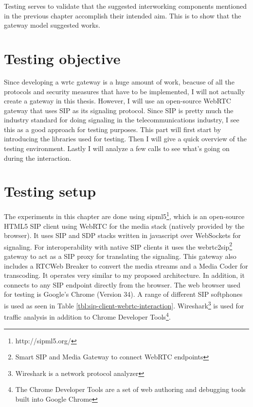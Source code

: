 



Testing serves to validate that the suggested interworking components mentioned in the previous chapter accomplish their intended aim. This is to show that the gateway model suggested works.

\section{Testing objective}
Since developing a \gls{wrtc} gateway is a huge amount of work, beacuse of all the protocols and security measures that have to be implemented, I will not actually create a gateway in this thesis. However, I will use an open-source WebRTC gateway that uses SIP as its signaling protocol. Since SIP is pretty much the industry standard for doing signaling in the telecommunications industry, I see this as a good approach for testing purposes. This part will first start by introducing the libraries used for testing. Then I will give a quick overview of the testing environment. Lastly I will analyze a few calls to see what's going on during the interaction.

\section{Testing setup}
The experiments in this chapter are done using sipml5\footnote{http://sipml5.org/}, which is an open-source HTML5 SIP client using WebRTC for the media stack (natively provided by the browser). It uses SIP and SDP stacks written in javascript over WebSockets for signaling. For interoperability with native SIP clients it uses the webrtc2sip\footnote{Smart SIP and Media Gateway to connect WebRTC endpoints} gateway to act as a SIP proxy for translating the signaling. This gateway also includes a RTCWeb Breaker to convert the media streams and a Media Coder for transcoding. It operates very similar to my proposed architecture. In addition, it connects to any SIP endpoint directly from the browser. The web browser used for testing is Google's Chrome (Version 34). A range of different SIP softphones is used as seen in Table \ref{tbl:sip-client-webrtc-interaction}. Wireshark\footnote{Wireshark is a network protocol analyzer} is used for traffic analysis in addition to Chrome Developer Tools\footnote{The Chrome Developer Tools are a set of web authoring and debugging tools built into Google Chrome}.

